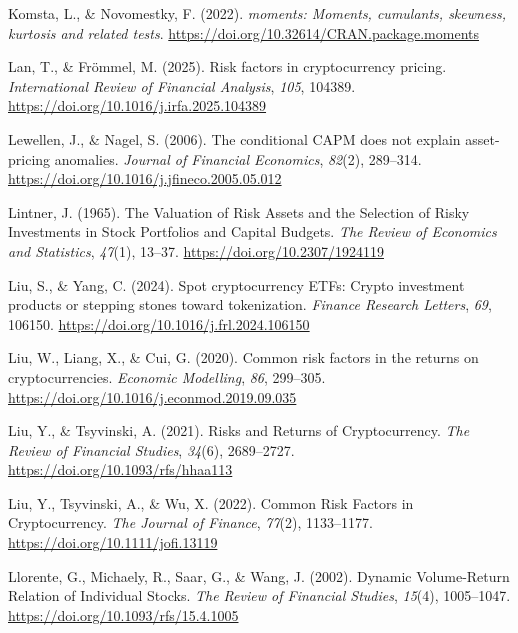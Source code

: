 \documentclass[
  12pt,
  a4paper,
  openany]{scrbook}
\newlength{\cslhangindent}
\newenvironment{CSLReferences}[2] %
 {\begin{list}{}{%
  \setlength{\itemindent}{0pt}
  \setlength{\leftmargin}{0pt}
  \setlength{\parsep}{0pt}
  \ifodd #1
   \setlength{\leftmargin}{\cslhangindent}
   \setlength{\itemindent}{-1\cslhangindent}
  \fi
  \setlength{\itemsep}{#2\baselineskip}}}
 {\end{list}}
\begin{document}
\begin{CSLReferences}{1}{0}
Komsta, L., \& Novomestky, F. (2022). \emph{{moments}: Moments,
cumulants, skewness, kurtosis and related tests}.
\url{https://doi.org/10.32614/CRAN.package.moments}

Lan, T., \& Frömmel, M. (2025). Risk factors in cryptocurrency pricing.
\emph{International Review of Financial Analysis}, \emph{105}, 104389.
\url{https://doi.org/10.1016/j.irfa.2025.104389}

Lewellen, J., \& Nagel, S. (2006). The conditional CAPM does not explain
asset-pricing anomalies. \emph{Journal of Financial Economics},
\emph{82}(2), 289--314.
\url{https://doi.org/10.1016/j.jfineco.2005.05.012}

Lintner, J. (1965). The Valuation of Risk Assets and the Selection of
Risky Investments in Stock Portfolios and Capital Budgets. \emph{The
Review of Economics and Statistics}, \emph{47}(1), 13--37.
\url{https://doi.org/10.2307/1924119}

Liu, S., \& Yang, C. (2024). Spot cryptocurrency ETFs: Crypto investment
products or stepping stones toward tokenization. \emph{Finance Research
Letters}, \emph{69}, 106150.
\url{https://doi.org/10.1016/j.frl.2024.106150}

Liu, W., Liang, X., \& Cui, G. (2020). Common risk factors in the
returns on cryptocurrencies. \emph{Economic Modelling}, \emph{86},
299--305. \url{https://doi.org/10.1016/j.econmod.2019.09.035}

Liu, Y., \& Tsyvinski, A. (2021). Risks and Returns of Cryptocurrency.
\emph{The Review of Financial Studies}, \emph{34}(6), 2689--2727.
\url{https://doi.org/10.1093/rfs/hhaa113}

Liu, Y., Tsyvinski, A., \& Wu, X. (2022). Common Risk Factors in
Cryptocurrency. \emph{The Journal of Finance}, \emph{77}(2), 1133--1177.
\url{https://doi.org/10.1111/jofi.13119}

Llorente, G., Michaely, R., Saar, G., \& Wang, J. (2002). Dynamic
Volume-Return Relation of Individual Stocks. \emph{The Review of
Financial Studies}, \emph{15}(4), 1005--1047.
\url{https://doi.org/10.1093/rfs/15.4.1005}


\end{CSLReferences}
\end{document}
